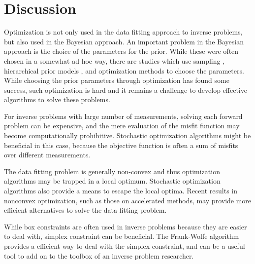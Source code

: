 \section{Discussion}
\label{sec:discussion}

Optimization is not only used in the data fitting approach to inverse problems,
but also used in the Bayesian approach.
An important problem in the Bayesian approach is the choice of the
parameters for the prior.
While these were often chosen in a somewhat ad hoc way, there are studies which
use sampling \cite{fox2016fast,agapiou2014analysis},
hierarchical prior models \cite{calvetti2007gaussian,calvetti2008hypermodels}, 
and optimization \cite{bardsley2010hierarchical,liu2017approximate} methods to
choose the parameters.
While choosing the prior parameters through optimization has found some success,
such optimization is hard and it remains a challenge to develop effective
algorithms to solve these problems.

For inverse problems with large number of measurements, solving each forward
problem can be expensive, and the mere evaluation of the misfit function may
become computationally prohibitive. 
Stochastic optimization algorithms might be beneficial in this case, because the
objective function is often a sum of misfits over different measurements.

The data fitting problem is generally non-convex and thus optimization
algorithms may be trapped in a local optimum.
Stochastic optimization algorithms also provide a means to escape the local
optima. 
Recent results in nonconvex optimization, such as those on accelerated methods,
may provide more efficient alternatives to solve the data fitting problem.

While box constraints are often used in inverse problems because they are easier to
deal with, simplex constraint can be beneficial. 
The Frank-Wolfe algorithm provides a efficient way to deal with the simplex
constraint, and can be a useful tool to add on to the toolbox of an inverse
problem researcher.

